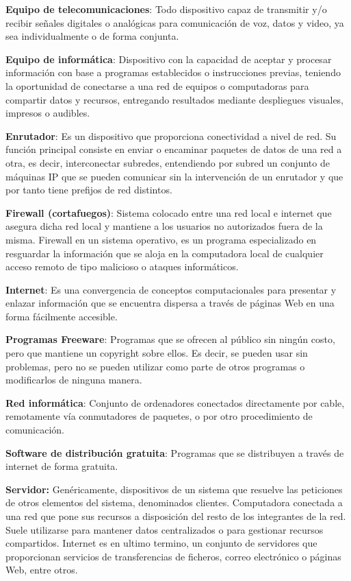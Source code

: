 \documentclass{book}
\begin{document}
        \textbf{Equipo de telecomunicaciones}: Todo dispositivo capaz de transmitir y/o recibir
        señales digitales o analógicas para comunicación de voz, datos y video, ya sea
        individualmente o de forma conjunta.

        \textbf{Equipo de informática}: Dispositivo con la capacidad de aceptar y procesar
        información con base a programas establecidos o instrucciones previas, teniendo la
        oportunidad de conectarse a una red de equipos o computadoras para compartir datos y
        recursos, entregando resultados mediante despliegues visuales, impresos o audibles.

        \textbf{Enrutador}: Es un dispositivo que proporciona conectividad a nivel de red. Su
        función principal consiste en enviar o encaminar paquetes de datos de una red a otra, es
        decir, interconectar subredes, entendiendo por subred un conjunto de máquinas IP que
        se pueden comunicar sin la intervención de un enrutador y que por tanto tiene prefijos
        de red distintos.

        \textbf{Firewall (cortafuegos)}: Sistema colocado entre una red local e internet que asegura
        dicha red local y mantiene a los usuarios no autorizados fuera de la misma. Firewall en
        un sistema operativo, es un programa especializado en resguardar la información que se
        aloja en la computadora local de cualquier acceso remoto de tipo malicioso o ataques
        informáticos.

        \textbf{Internet}: Es una convergencia de conceptos computacionales para presentar y
        enlazar información que se encuentra dispersa a través de páginas Web en una forma
        fácilmente accesible.

        \textbf{Programas Freeware}: Programas que se ofrecen al público sin ningún costo, pero
        que mantiene un copyright sobre ellos. Es decir, se pueden usar sin problemas, pero no
        se pueden utilizar como parte de otros programas o modificarlos de ninguna manera.

        \textbf{Red informática}: Conjunto de ordenadores conectados directamente por cable,
        remotamente vía conmutadores de paquetes, o por otro procedimiento de comunicación.

        \textbf{Software de distribución gratuita}: Programas que se distribuyen a través de
        internet de forma gratuita.

        \textbf{Servidor:} Genéricamente, dispositivos de un sistema que resuelve las peticiones
        de otros elementos del sistema, denominados clientes. Computadora conectada a una
        red que pone sus recursos a disposición del resto de los integrantes de la red. Suele
        utilizarse para mantener datos centralizados o para gestionar recursos compartidos.
        Internet es en ultimo termino, un conjunto de servidores que proporcionan servicios de
        transferencias de ficheros, correo electrónico o páginas Web, entre otros.
    \
\end{document}
